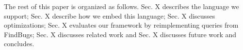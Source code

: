 \documentclass{article}
\begin{document}
The rest of this paper is organized as follows. Sec. X describes the
language we support; Sec. X describe how we embed this language; Sec. X
discusses optimizations; Sec. X evaluates our framework by
reimplementing queries from FindBugs; Sec. X discusses related work and
Sec. X discusses future work and concludes.

%
%
%
%
\end{document}

